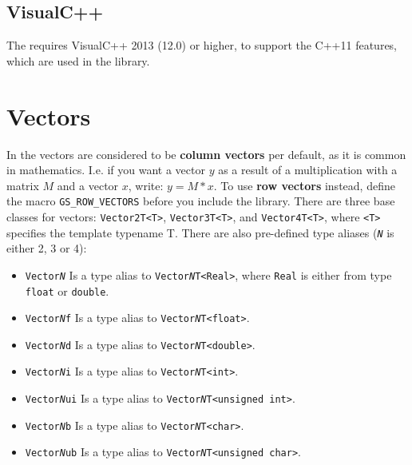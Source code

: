\documentclass{article}
\begin{document}
\subsection*{VisualC++}

The \gausslib requires VisualC++ 2013 (12.0) or higher, to support the C++11 features, which are used in the library.



\section*{Vectors}

In the \gausslib vectors are considered to be \textbf{column vectors} per default, as it is common in mathematics.
I.e. if you want a vector $y$ as a result of a multiplication with a matrix $M$ and a vector $x$,
write: $y = M * x$.
To use \textbf{row vectors} instead, define the macro \texttt{GS\_ROW\_VECTORS} before you include the library.
There are three base classes for vectors: \texttt{Vector2T<T>}, \texttt{Vector3T<T>}, and \texttt{Vector4T<T>},
where \texttt{<T>} specifies the template typename T. There are also pre-defined type aliases
(\texttt{\textit{N}} is either 2, 3 or 4):
\begin{itemize}
	\item \texttt{Vector\textit{N}} Is a type alias to \texttt{Vector\textit{N}T<Real>}, where \texttt{Real} is either
		from type \texttt{float} or \texttt{double}.
	\item \texttt{Vector\textit{N}f} Is a type alias to \texttt{Vector\textit{N}T<float>}.
	\item \texttt{Vector\textit{N}d} Is a type alias to \texttt{Vector\textit{N}T<double>}.
	\item \texttt{Vector\textit{N}i} Is a type alias to \texttt{Vector\textit{N}T<int>}.
	\item \texttt{Vector\textit{N}ui} Is a type alias to \texttt{Vector\textit{N}T<unsigned int>}.
	\item \texttt{Vector\textit{N}b} Is a type alias to \texttt{Vector\textit{N}T<char>}.
	\item \texttt{Vector\textit{N}ub} Is a type alias to \texttt{Vector\textit{N}T<unsigned char>}.
\end{itemize}
\end{document}
